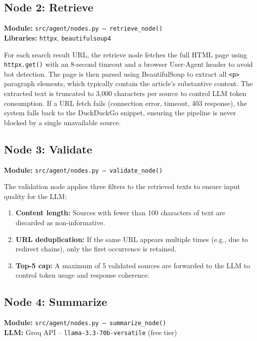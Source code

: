 \documentclass[12pt, a4paper]{article}
\begin{document}
\subsection{Node 2: Retrieve}

\textbf{Module:} \texttt{src/agent/nodes.py -- retrieve\_node()} \\
\textbf{Libraries:} \texttt{httpx}, \texttt{beautifulsoup4}

For each search result URL, the retrieve node fetches the full HTML page using \texttt{httpx.get()} with an 8-second timeout and a browser User-Agent header to avoid bot detection. The page is then parsed using BeautifulSoup to extract all \texttt{<p>} paragraph elements, which typically contain the article's substantive content. The extracted text is truncated to 3,000 characters per source to control LLM token consumption. If a URL fetch fails (connection error, timeout, 403 response), the system falls back to the DuckDuckGo snippet, ensuring the pipeline is never blocked by a single unavailable source.

\subsection{Node 3: Validate}

\textbf{Module:} \texttt{src/agent/nodes.py -- validate\_node()}

The validation node applies three filters to the retrieved texts to ensure input quality for the LLM:
\begin{enumerate}
  \item \textbf{Content length:} Sources with fewer than 100 characters of text are discarded as non-informative.
  \item \textbf{URL deduplication:} If the same URL appears multiple times (e.g., due to redirect chains), only the first occurrence is retained.
  \item \textbf{Top-5 cap:} A maximum of 5 validated sources are forwarded to the LLM to control token usage and response coherence.
\end{enumerate}

\subsection{Node 4: Summarize}

\textbf{Module:} \texttt{src/agent/nodes.py -- summarize\_node()} \\
\textbf{LLM:} Groq API -- \texttt{llama-3.3-70b-versatile} (free tier)
\end{document}
